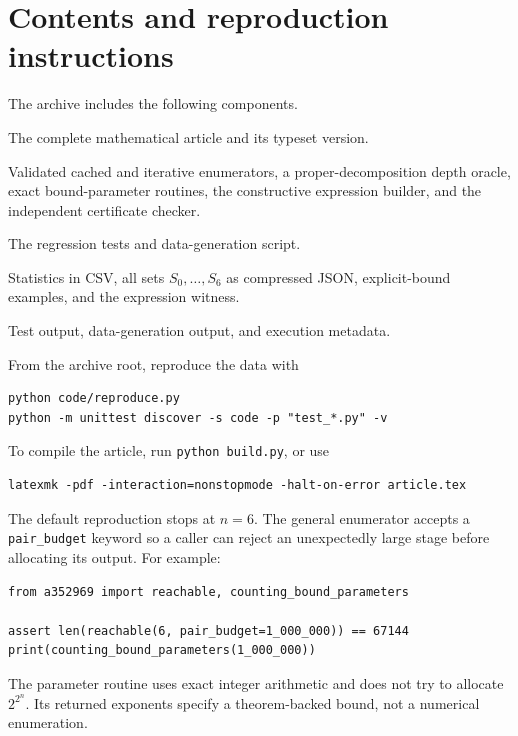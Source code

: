 \documentclass[11pt,a4paper]{article}
\theoremstyle{definition}
\theoremstyle{remark}
\begin{document}
\appendix
\section{Contents and reproduction instructions}\label{app:reproduce}
The archive includes the following components.
\begin{description}[style=nextline]
\item[\texttt{article.tex}, \texttt{article.pdf}]
The complete mathematical article and its typeset version.
\item[\texttt{code/a352969.py}]
Validated cached and iterative enumerators, a proper-decomposition depth
oracle, exact bound-parameter routines, the constructive expression
builder, and the independent certificate checker.
\item[\texttt{code/test\_a352969.py}, \texttt{code/reproduce.py}]
The regression tests and data-generation script.
\item[\texttt{data/}]
Statistics in CSV, all sets $S_0,\ldots,S_6$ as compressed JSON,
explicit-bound examples, and the expression witness.
\item[\texttt{verification/}]
Test output, data-generation output, and execution metadata.
\end{description}

From the archive root, reproduce the data with
\begin{lstlisting}[language={}]
python code/reproduce.py
python -m unittest discover -s code -p "test_*.py" -v
\end{lstlisting}
To compile the article, run \texttt{python build.py}, or use
\begin{lstlisting}[language={}]
latexmk -pdf -interaction=nonstopmode -halt-on-error article.tex
\end{lstlisting}
\begin{minipage}{\linewidth}
The default reproduction stops at $n=6$. The general enumerator accepts a
\texttt{pair\_budget} keyword so a caller can reject an unexpectedly large
stage before allocating its output. For example:
\begin{lstlisting}
from a352969 import reachable, counting_bound_parameters

assert len(reachable(6, pair_budget=1_000_000)) == 67144
print(counting_bound_parameters(1_000_000))
\end{lstlisting}
\end{minipage}
The parameter routine uses exact integer arithmetic and does not try to
allocate $2^{2^n}$. Its returned exponents specify a theorem-backed bound,
not a numerical enumeration.
\end{document}
